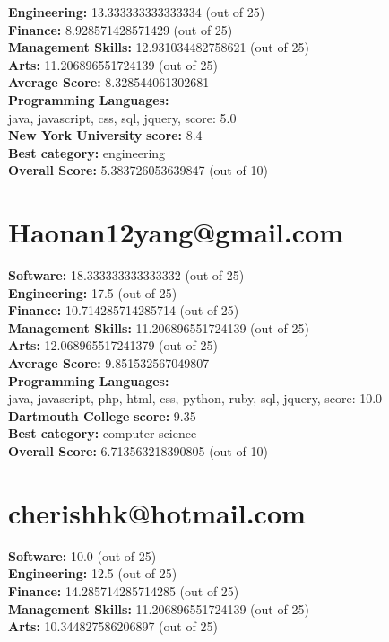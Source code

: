 \documentclass{article}
\begin{document}
\textbf{Engineering: } 13.333333333333334 (out of 25)\\
\textbf{Finance:} 8.928571428571429 (out of 25)\\
\textbf{Management Skills:} 12.931034482758621 (out of 25)\\
\textbf{Arts:} 11.206896551724139 (out of 25)\\
\textbf{Average Score: } 8.328544061302681\\
\textbf{Programming Languages:} \\
java, javascript, css, sql, jquery, score: 5.0\\
\textbf{New York University} \textbf{score:} 8.4\\
\textbf{Best category: } engineering\\
\textbf{Overall Score: }5.383726053639847 (out of 10)\section{Haonan12yang@gmail.com}
\textbf{Software:} 18.333333333333332 (out of 25)\\
\textbf{Engineering: } 17.5 (out of 25)\\
\textbf{Finance:} 10.714285714285714 (out of 25)\\
\textbf{Management Skills:} 11.206896551724139 (out of 25)\\
\textbf{Arts:} 12.068965517241379 (out of 25)\\
\textbf{Average Score: } 9.851532567049807\\
\textbf{Programming Languages:} \\
java, javascript, php, html, css, python, ruby, sql, jquery, score: 10.0\\
\textbf{Dartmouth College} \textbf{score:} 9.35\\
\textbf{Best category: } computer science\\
\textbf{Overall Score: }6.713563218390805 (out of 10)\section{cherishhk@hotmail.com}
\textbf{Software:} 10.0 (out of 25)\\
\textbf{Engineering: } 12.5 (out of 25)\\
\textbf{Finance:} 14.285714285714285 (out of 25)\\
\textbf{Management Skills:} 11.206896551724139 (out of 25)\\
\textbf{Arts:} 10.344827586206897 (out of 25)\\
\end{document}
